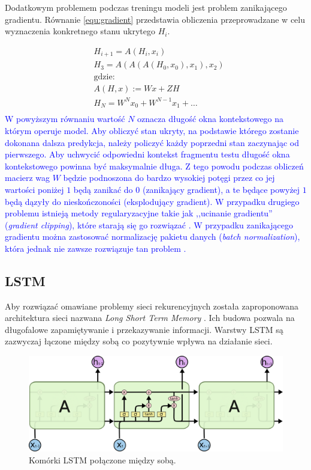 \documentclass[data-science]{agh-wi} %
\begin{document}
Dodatkowym problemem podczas treningu modeli jest problem zanikającego gradientu. Równanie \ref*{equ:gradient} przedstawia obliczenia przeprowadzane w celu wyznaczenia konkretnego stanu ukrytego $H_i$.

\begin{equation}
    \begin{aligned}
         & H_{i+1}=A(H_i, x_i)              \\
         & H_3=A(A(A(H_0, x_0), x_1), x_2)  \\
         & \text{gdzie:}                    \\
         & A(H, x) := Wx+ZH                 \\
         & H_N=W^Nx_0 + W^{N-1}x_1  + \dots \\
    \end{aligned}
    \label{equ:gradient}
\end{equation}
\textcolor{blue}{W powyższym równaniu wartość $N$ oznacza długość okna kontekstowego na którym operuje model. Aby obliczyć stan ukryty, na podstawie którego zostanie dokonana dalsza predykcja, należy policzyć każdy poprzedni stan zaczynając od pierwszego. Aby uchwycić odpowiedni kontekst fragmentu testu długość okna kontekstowego powinna być maksymalnie długa. Z tego powodu podczas obliczeń macierz wag $W$ będzie podnoszona do bardzo wysokiej potęgi przez co jej wartości poniżej $1$ będą zanikać do $0$ (zanikający gradient), a te będące powyżej $1$ będą dązyły do nieskończoności (eksplodujący gradient). W przypadku drugiego problemu istnieją metody regularyzacyjne takie jak ,,ucinanie gradientu'' (\textit{gradient clipping}), które starają się go rozwiązać \cite*{deeplearning_book}. W przypadku zanikającego gradientu można zastosować normalizację pakietu danych (\textit{batch normalization}), która jednak nie zawsze rozwiązuje tan problem \cite*{batch_norm}.}

\subsection{LSTM}
Aby rozwiązać omawiane problemy sieci rekurencyjnych została zaproponowana architektura sieci nazwana \textit{Long Short Term Memory} \cite{lstm_og}. Ich budowa pozwala na długofalowe zapamiętywanie i przekazywanie informacji. Warstwy LSTM są zazwyczaj łączone między sobą co pozytywnie wpływa na działanie sieci.

\begin{figure}[ht!]
    \begin{center}
        \includegraphics[width=0.6\linewidth]{./img/LSTM3-chain.png}
    \end{center}
    \caption{Komórki LSTM połączone między sobą.}\label{fig:lstm_chain}
\end{figure}
\end{document}
